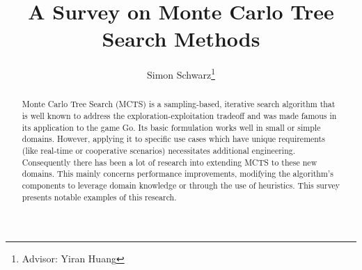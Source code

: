 

\title{A Survey on Monte Carlo Tree Search Methods}
\author{Simon Schwarz\thanks{Advisor: Yiran Huang}}
\maketitle
\begin{abstract}
Monte Carlo Tree Search (MCTS) is a sampling-based, iterative search algorithm that is well known to address the exploration-exploitation tradeoff and was made famous in its application to the game Go. Its basic formulation works well in small or simple domains. However, applying it to specific use cases which have unique requirements (like real-time or cooperative scenarios) necessitates additional engineering. Consequently there has been a lot of research into extending MCTS to these new domains. This mainly concerns performance improvements, modifying the algorithm's components to leverage domain knowledge or through the use of heuristics. This survey presents notable examples of this research.
\end{abstract}








